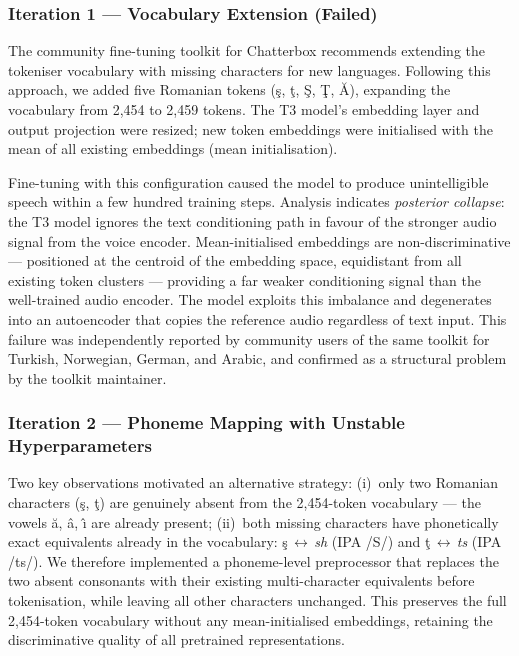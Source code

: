 \documentclass[conference]{IEEEtran}
\begin{document}
\subsubsection{Iteration 1 — Vocabulary Extension (Failed)}

The community fine-tuning toolkit for Chatterbox recommends
extending the tokeniser vocabulary with missing characters for new
languages.
Following this approach, we added five Romanian tokens
(\c{s}, \c{t}, \c{S}, \c{T}, \u{A}),
expanding the vocabulary from 2,454 to 2,459 tokens.
The T3 model's embedding layer and output projection were resized;
new token embeddings were initialised with the mean of all existing
embeddings (mean initialisation).

Fine-tuning with this configuration caused the model to produce
unintelligible speech within a few hundred training steps.
Analysis indicates \emph{posterior collapse}: the T3 model ignores
the text conditioning path in favour of the stronger audio signal
from the voice encoder.
Mean-initialised embeddings are non-discriminative — positioned at
the centroid of the embedding space, equidistant from all existing
token clusters — providing a far weaker conditioning signal than the
well-trained audio encoder.
The model exploits this imbalance and degenerates into an
autoencoder that copies the reference audio regardless of text input.
This failure was independently reported by community users of the
same toolkit for Turkish, Norwegian, German, and Arabic, and
confirmed as a structural problem by the toolkit maintainer.

\subsubsection{Iteration 2 — Phoneme Mapping with Unstable Hyperparameters}

Two key observations motivated an alternative strategy:
(i)~only two Romanian characters (\c{s}, \c{t}) are
genuinely absent from the 2,454-token vocabulary — the vowels
\u{a}, \^{a}, \^{\i} are already present;
(ii)~both missing characters have phonetically exact equivalents
already in the vocabulary: \c{s}$\,{\leftrightarrow}\,$\textit{sh}
(IPA /\textrm{S}/) and \c{t}$\,{\leftrightarrow}\,$\textit{ts}
(IPA /\textrm{ts}/).
We therefore implemented a phoneme-level preprocessor that replaces
the two absent consonants with their existing multi-character
equivalents before tokenisation, while leaving all other characters
unchanged.
This preserves the full 2,454-token vocabulary without any
mean-initialised embeddings, retaining the discriminative quality of
all pretrained representations.
\end{document}
